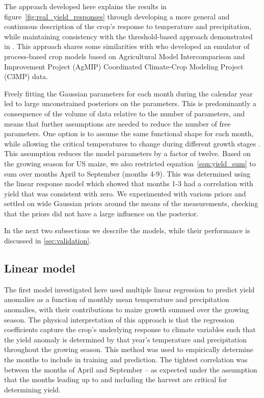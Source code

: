 \documentclass[12pt]{article}
\begin{document}
The approach developed here explains the results in figure~\ref{fig:real_yield_responses} through developing a more general and continuous description of the crop's response to temperature and precipitation, while maintaining consistency with the threshold-based approach demonstrated in \cite{kent:2017}. This approach shares some similarities with \cite{snyder:2018} who developed an emulator of process-based crop models based on Agricultural Model Intercomparison and Improvement Project (AgMIP) Coordinated Climate-Crop Modeling Project (C3MP) data.

Freely fitting the Gaussian parameters for each month during the calendar year led to large unconstrained posteriors on the parameters. This is predominantly a consequence of the volume of data relative to the number of parameters, and means that further assumptions are needed to reduce the number of free parameters. One option is to assume the same functional shape for each month, while allowing the critical temperatures to change during different growth stages \citep[e.g.][]{hatfield:2011, sanchez:2014}. This assumption reduces the model parameters by a factor of twelve. Based on the growing season for US maize, we also restricted equation~\ref{eqn:yield_sum} to sum over months April to September (months 4-9). This was determined using the linear response model which showed that months 1-3 had a correlation with yield that was consistent with zero. We experimented with various priors and settled on wide Gaussian priors around the means of the measurements, checking that the priors did not have a large influence on the posterior.

In the next two subsections we describe the models, while their performance is discussed in \ref{sec:validation}.

\subsection{Linear model}
\label{sec:appendix_linear}

The first model investigated here used multiple linear regression to predict yield anomalies as a function of monthly mean temperature and precipitation anomalies, with their contributions to maize growth summed over the growing season. The physical interpretation of this approach is that the regression coefficients capture the crop's underlying response to climate variables such that the yield anomaly is determined by that year's temperature and precipitation throughout the growing season. This method was used to empirically determine the months to include in training and prediction. The tightest correlation was between the months of April and September -- as expected under the assumption that the months leading up to and including the harvest are critical for determining yield.
\end{document}
